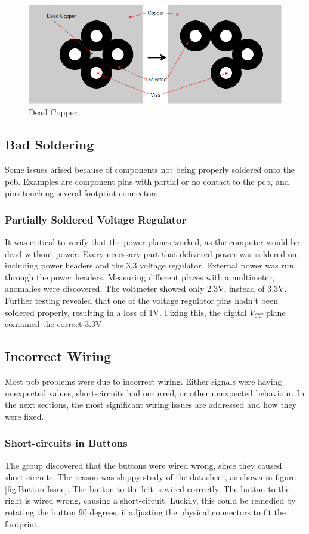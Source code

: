 \begin{figure}[h!]
\centering
\includegraphics[scale = 0.4]{images/Dead_Copper.png}
\caption{Dead Copper.}
\label{fig:Dead copper}
\end{figure}

\subsection{Bad Soldering}
Some issues arised because of components not being properly soldered onto the \gls{pcb}. Examples are component pins with partial or no contact to the \gls{pcb}, and pins touching several footprint connectors.

\subsubsection{Partially Soldered Voltage Regulator}
It was critical to verify that the power planes worked, as the computer would be dead without power.
Every necessary part that delivered power was soldered on, including power headers and the 3.3 voltage regulator.
External power was run through the power headers.
Measuring different places with a multimeter, anomalies were discovered.
The voltmeter showed only 2.3V, instead of 3.3V.
Further testing revealed that one of the voltage regulator pins hadn't been soldered properly, resulting in a loss of 1V.
Fixing this, the digital \(V_{CC}\) plane contained the correct 3.3V.

\subsection{Incorrect Wiring}
Most \gls{pcb} problems were due to incorrect wiring.
Either signals were having unexpected values, short-circuits had occurred, or other unexpected behaviour.
In the next sections, the most significant wiring issues are addressed and how they were fixed.

\subsubsection{Short-circuits in Buttons}
The group discovered that the buttons were wired wrong, since they caused short-circuits.
The reason was sloppy study of the datasheet, as shown in figure \ref{fig:Button Issue}. The button to the left is wired correctly. The button to the right is wired wrong, causing a short-circuit.
Luckily, this could be remedied by rotating the button 90 degrees, if adjusting the physical connectors to fit the footprint. 


